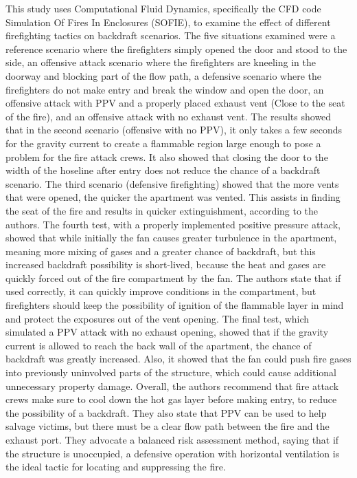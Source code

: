 \documentclass{article}
\begin{document}
This study uses Computational Fluid Dynamics, specifically the CFD code Simulation Of Fires In Enclosures (SOFIE), to examine the effect of different firefighting tactics on backdraft scenarios. The five situations examined were a reference scenario where the firefighters simply opened the door and stood to the side, an offensive attack scenario where the firefighters are kneeling in the doorway and blocking part of the flow path, a defensive scenario where the firefighters do not make entry and break the window and open the door, an offensive attack with PPV and a properly placed exhaust vent (Close to the seat of the fire), and an offensive attack with no exhaust vent. The results showed that in the second scenario (offensive with no PPV), it only takes a few seconds for the gravity current to create a flammable region large enough to pose a problem for the fire attack crews. It also showed that closing the door to the width of the hoseline after entry does not reduce the chance of a backdraft scenario. The third scenario (defensive firefighting) showed that the more vents that were opened, the quicker the apartment was vented. This assists in finding the seat of the fire and results in quicker extinguishment, according to the authors. The fourth test, with a properly implemented positive pressure attack, showed that while initially the fan causes greater turbulence in the apartment, meaning more mixing of gases and a greater chance of backdraft, but this increased backdraft possibility is short-lived, because the heat and gases are quickly forced out of the fire compartment by the fan. The authors state that if used correctly, it can quickly improve conditions in the compartment, but firefighters should keep the possibility of ignition of the flammable layer in mind and protect the exposures out of the vent opening. The final test, which simulated a PPV attack with no exhaust opening, showed that if the gravity current is allowed to reach the back wall of the apartment, the chance of backdraft was greatly increased. Also, it showed that the fan could push fire gases into previously uninvolved parts of the structure, which could cause additional unnecessary property damage. Overall, the authors recommend that fire attack crews make sure to cool down the hot gas layer before making entry, to reduce the possibility of a backdraft. They also state that PPV can be used to help salvage victims, but there must be a clear flow path between the fire and the exhaust port. They advocate a balanced risk assessment method, saying that if the structure is unoccupied, a defensive operation with horizontal ventilation is the ideal tactic for locating and suppressing the fire.\cite{Backdraft}\\
	
\end{document}

